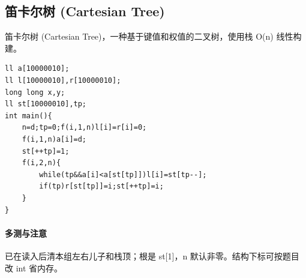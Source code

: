 \subsection{笛卡尔树 (Cartesian Tree)}
笛卡尔树 (Cartesian Tree)，一种基于键值和权值的二叉树，使用栈 O(n) 线性构建。
\begin{lstlisting}
ll a[10000010];
ll l[10000010],r[10000010];
long long x,y;
ll st[10000010],tp;
int main(){
	n=d;tp=0;f(i,1,n)l[i]=r[i]=0;
    f(i,1,n)a[i]=d;
	st[++tp]=1;
	f(i,2,n){
		while(tp&&a[i]<a[st[tp]])l[i]=st[tp--];
		if(tp)r[st[tp]]=i;st[++tp]=i;
	}
}
\end{lstlisting}

\paragraph{多测与注意} 已在读入后清本组左右儿子和栈顶；根是 st[1]，n 默认非零。结构下标可按题目改 int 省内存。
